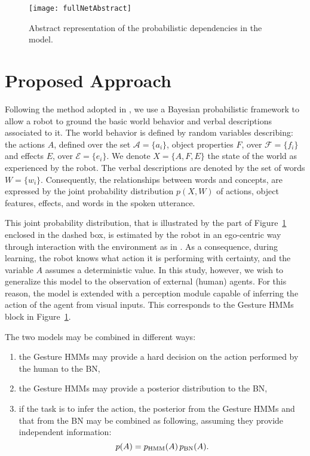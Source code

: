 
\begin{figure}
  \centering
  \texttt{[image: fullNetAbstract]}
  \caption{Abstract representation of the probabilistic dependencies in the model.}
  \label{fig:model}
\end{figure}

\section{Proposed Approach}
Following the method adopted in \cite{salvi:2012:smcb}, we use a Bayesian probabilistic framework to allow a robot to ground the basic world behavior and verbal descriptions associated to it.
The world behavior is defined by random variables describing: the actions $A$, defined over the set $\mathcal{A}=\{a_i\}$, object properties $F$, over $\mathcal{F}=\{f_i\}$ and effects $E$, over $\mathcal{E}=\{e_i\}$.
We denote $X=\{A, F, E\}$ the state of the world as experienced by the robot.
The verbal descriptions are denoted by the set of words $W=\{w_i\}$.
Consequently, the relationships between words and concepts, are expressed by the joint probability distribution $p(X,W)$ of actions, object features, effects, and words in the spoken utterance.

This joint probability distribution, that is illustrated by the part of Figure~\ref{fig:model} enclosed in the dashed box, is estimated by the robot in an ego-centric way through interaction with the environment as in \cite{salvi:2012:smcb}.
As a consequence, during learning, the robot knows what action it is performing with certainty, and the variable $A$ assumes a deterministic value.
In this study, however, we wish to generalize this model to the observation of external (human) agents.
For this reason, the model is extended with a perception module capable of inferring the action of the agent from visual inputs.
This corresponds to the Gesture \acp{HMM} block in Figure~\ref{fig:model}.

The two models may be combined in different ways:
\begin{enumerate}
\item the Gesture \acp{HMM} may provide a hard decision on the action performed by the human to the \ac{BN},
\item the Gesture \acp{HMM} may provide a posterior distribution to the \ac{BN},
\item if the task is to infer the action, the posterior from the Gesture \acp{HMM} and that from the \ac{BN} may be combined as following, assuming they provide independent information:
  $$ p(A) = p_{\mbox{\scriptsize HMM}}(A) \, p_{\mbox{\scriptsize BN}}(A).$$
\end{enumerate}

